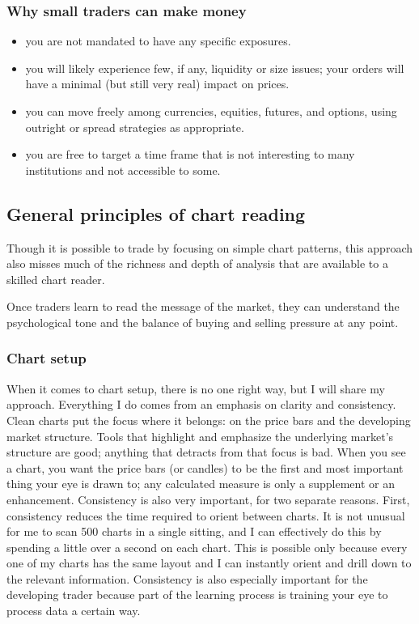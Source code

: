 \documentclass[10pt,twocolumn]{article}
\begin{document}
\subsubsection{Why small traders can make money}
\begin{itemize}
  \item you are not mandated to have any specific exposures.
  \item you will likely experience few, if any, liquidity or size issues; your orders will have a minimal (but still very real) impact on prices.
  \item you can move freely among currencies, equities, futures, and options, using outright or spread strategies as appropriate.
  \item you are free to target a time frame that is not interesting to many institutions and not accessible to some.
\end{itemize}

\subsection{General principles of chart reading}
Though it is possible to trade by focusing on simple chart patterns, this approach also misses much of the richness and depth of analysis that are available to a skilled chart reader.

Once traders learn to read the message of the market, they can understand the psychological tone and the balance of buying and selling pressure at any point.

\subsubsection{Chart setup}

When it comes to chart setup, there is no one right way, but I will share my approach. Everything I do comes from an emphasis on clarity and consistency. Clean charts put the focus where it belongs: on the price bars and the developing market structure. Tools that highlight and emphasize the underlying market’s structure are good; anything that detracts from that focus is bad. When you see a chart, you want the price bars (or candles) to be the first and most important thing your eye is drawn to; any calculated measure is only a supplement or an enhancement. Consistency is also very important, for two separate reasons. First, consistency reduces the time required to orient between charts. It is not unusual for me to scan 500 charts in a single sitting, and I can effectively do this by spending a little over a second on each chart. This is possible only because every one of my charts has the same layout and I can instantly orient and drill down to the relevant information. Consistency is also especially important for the developing trader because part of the learning process is training your eye to process data a certain way.
\end{document}
